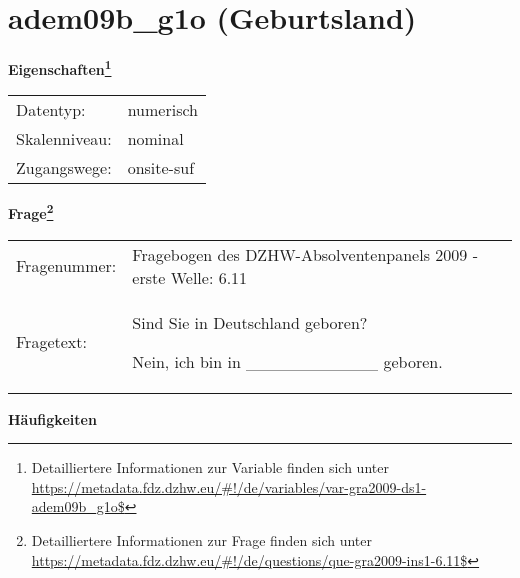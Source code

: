 
    \setcounter{footnote}{0}

    \vspace*{-1.8cm}
	\section{adem09b\_g1o (Geburtsland)}
	\label{section:adem09b_g1o}



    \vspace*{0.5cm}
    \noindent\textbf{Eigenschaften\footnote{Detailliertere Informationen zur Variable finden sich unter
		\url{https://metadata.fdz.dzhw.eu/\#!/de/variables/var-gra2009-ds1-adem09b_g1o$}}}\\
	\begin{tabularx}{\hsize}{@{}lX}
	Datentyp: & numerisch \\
	Skalenniveau: & nominal \\
	Zugangswege: &
	  onsite-suf
 \\
    \end{tabularx}



				\vspace*{0.5cm}
                \noindent\textbf{Frage\footnote{Detailliertere Informationen zur Frage finden sich unter
		              \url{https://metadata.fdz.dzhw.eu/\#!/de/questions/que-gra2009-ins1-6.11$}}}\\
				\begin{tabularx}{\hsize}{@{}lX}
					Fragenummer: &
					  Fragebogen des DZHW-Absolventenpanels 2009 - erste Welle:
					  6.11
 \\
					Fragetext: & Sind Sie in Deutschland geboren?\par  Nein, ich bin in \_\_\_\_\_\_\_\_\_\_\_ geboren. \\
				\end{tabularx}





        		\vspace*{0.5cm}
                \noindent\textbf{Häufigkeiten}

